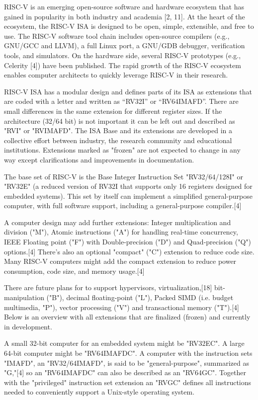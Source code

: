 
\label{sec:bak}
RISC-V is an emerging open-source software and hardware ecosystem that has gained in popularity in both industry and academia [2, 11]. At the heart of the ecosystem, the RISC-V ISA is designed to be open, simple, extensible, and free to use. The RISC-V software tool chain includes open-source compilers (e.g., GNU/GCC and LLVM), a full Linux port, a GNU/GDB debugger, verification tools, and simulators. On the hardware side, several RISC-V prototypes (e.g., Celerity [4]) have been published. The rapid growth of the RISC-V ecosystem enables computer architects to quickly leverage RISC-V in their research.

RISC-V ISA has a modular design and defines parts of its ISA as extensions that are coded with a letter and written as ``RV32I'' or ``RV64IMAFD''. There are small differences in the same extension for different register sizes. If the architecture (32/64 bit) is not important it can be left out and described as "RVI" or "RVIMAFD". The ISA Base and its extensions are developed in a collective effort between industry, the research community and educational institutions. Extensions marked as "frozen" are not expected to change in any way except clarifications and improvements in documentation.

The base set of RISC-V is the Base Integer Instruction Set "RV32/64/128I" or "RV32E" (a reduced version of RV32I that supports only 16 registers designed for embedded systems). This set by itself can implement a simplified general-purpose computer, with full software support, including a general-purpose compiler.[4]

A computer design may add further extensions: Integer multiplication and division ("M"), Atomic instructions ("A") for handling real-time concurrency, IEEE Floating point ("F") with Double-precision ("D") and Quad-precision ("Q") options.[4] There's also an optional "compact" ("C") extension to reduce code size. Many RISC-V computers might add the compact extension to reduce power consumption, code size, and memory usage.[4]

There are future plans for to support hypervisors, virtualization,[18] bit-manipulation ("B"), decimal floating-point ("L"), Packed SIMD (i.e. budget multimedia, "P"), vector processing ("V") and transactional memory ("T").[4] Below is an overview with all extensions that are finalized (frozen) and currently in development.

A small 32-bit computer for an embedded system might be "RV32EC". A large 64-bit computer might be "RV64IMAFDC". A computer with the instruction sets "IMAFD", an "RV32/64IMAFD", is said to be "general-purpose", summarized as "G,"[4] so an "RV64IMAFDC" can also be described as an "RV64GC". Together with the "privileged" instruction set extension an "RVGC" defines all instructions needed to conveniently support a Unix-style operating system.


